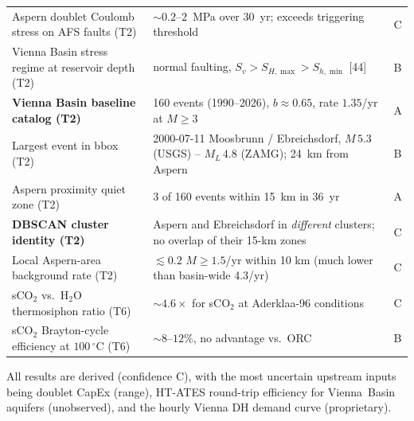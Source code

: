 \documentclass{article}
\begin{document}
\begin{center}
\begin{tabular}{lll}
Aspern doublet Coulomb stress on AFS faults (T2) & $\sim 0.2$--$2$~MPa over 30~yr; exceeds triggering threshold & C \\
Vienna Basin stress regime at reservoir depth (T2) & normal faulting, $S_v > S_{H,\max} > S_{h,\min}$ [44] & B \\
\textbf{Vienna Basin baseline catalog (T2)}     & 160 events (1990--2026), $b\approx 0.65$, rate $1.35$/yr at $M\geq 3$ & A \\
Largest event in bbox (T2)                       & 2000-07-11 Moosbrunn / Ebreichsdorf, $M\,5.3$ (USGS) -- $M_L\,4.8$ (ZAMG); 24~km from Aspern & B \\
Aspern proximity quiet zone (T2)                 & 3 of 160 events within 15~km in 36~yr & A \\
\textbf{DBSCAN cluster identity (T2)}            & Aspern and Ebreichsdorf in \emph{different} clusters; no overlap of their 15-km zones & C \\
Local Aspern-area background rate (T2)           & $\lesssim 0.2$ $M\geq 1.5$/yr within 10 km (much lower than basin-wide 4.3/yr) & C \\
sCO$_2$ vs.\ H$_2$O thermosiphon ratio (T6)      & $\sim 4.6\times$ for sCO$_2$ at Aderklaa-96 conditions & C \\
sCO$_2$ Brayton-cycle efficiency at $100\,^\circ$C (T6) & $\sim 8$--$12\%$, no advantage vs.\ ORC & B \\
\hline
\end{tabular}
\end{center}

All results are derived (confidence C), with the most uncertain
upstream inputs being doublet CapEx (range), HT-ATES round-trip
efficiency for Vienna~Basin aquifers (unobserved), and the
hourly Vienna DH demand curve (proprietary).
\end{document}

